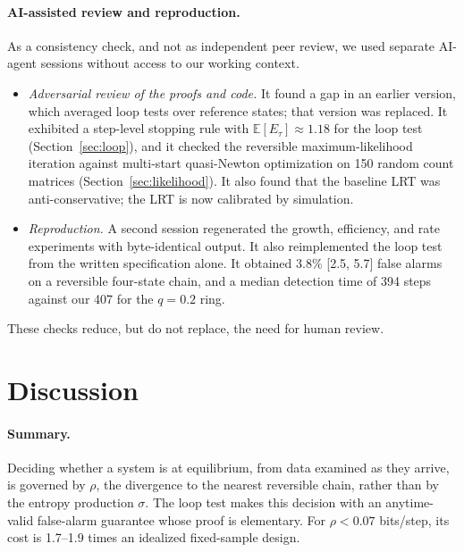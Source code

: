 \documentclass[11pt]{article}
\theoremstyle{definition}
\theoremstyle{remark}
\newcommand{\E}{\mathbb{E}}
\begin{document}
\paragraph{AI-assisted review and reproduction.} As a consistency check, and not as independent peer review, we used separate AI-agent sessions without access to our working context.
\begin{itemize}[leftmargin=1.25em,itemsep=0.1em]
\item \emph{Adversarial review of the proofs and code.} It found a gap in an earlier version, which averaged loop tests over reference states; that version was replaced. It exhibited a step-level stopping rule with $\E[E_\tau]\approx1.18$ for the loop test (Section~\ref{sec:loop}), and it checked the reversible maximum-likelihood iteration against multi-start quasi-Newton optimization on 150 random count matrices (Section~\ref{sec:likelihood}). It also found that the baseline LRT was anti-conservative; the LRT is now calibrated by simulation.
\item \emph{Reproduction.} A second session regenerated the growth, efficiency, and rate experiments with byte-identical output. It also reimplemented the loop test from the written specification alone. It obtained 3.8\% [2.5, 5.7] false alarms on a reversible four-state chain, and a median detection time of 394 steps against our 407 for the $q=0.2$ ring.
\end{itemize}
These checks reduce, but do not replace, the need for human review.

\section{Discussion}

\paragraph{Summary.} Deciding whether a system is at equilibrium, from data examined as they arrive, is governed by $\rho$, the divergence to the nearest reversible chain, rather than by the entropy production $\sigma$. The loop test makes this decision with an anytime-valid false-alarm guarantee whose proof is elementary. For $\rho<0.07$ bits/step, its cost is 1.7--1.9 times an idealized fixed-sample design.
\end{document}
